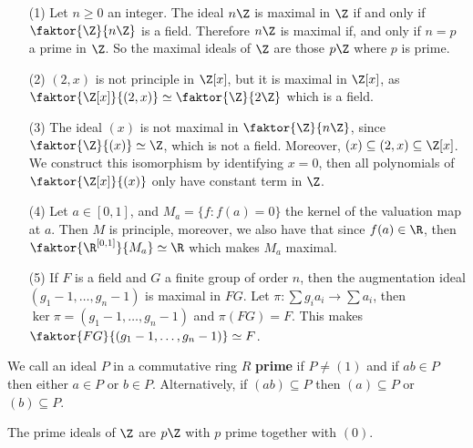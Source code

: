 \begin{example}\label{1.15}
    \begin{enumerate}
        \item[(1)] Let $n \geq 0$ an integer. The ideal  $n\Z$ is maximal in
            $\Z$ if and only if  $\faktor{\Z}{n\Z}$ is a field. Therefore $n\Z$
            is maximal if, and only if  $n=p$ a prime in $\Z$. So the maximal
            ideals of $\Z$ are those  $p\Z$ where  $p$ is prime.

        \item[(2)] $(2,x)$ is not principle in $\Z[x]$, but it is maximal in
            $\Z[x]$, as $\faktor{\Z[x]}{(2,x)} \simeq \faktor{\Z}{2\Z}$ which
            is a field.

        \item[(3)] The ideal $(x)$ is not maximal in $\faktor{\Z}{n\Z}$, since
            $\faktor{\Z}{(x)} \simeq \Z$, which is not a field. Moreover, $(x)
            \subseteq (2,x) \subseteq \Z[x]$. We construct this isomorphism by
            identifying $x=0$, then all polynomials of $\faktor{\Z[x]}{(x)}$ only
            have constant term in $\Z$.

        \item[(4)] Let $a \in [0,1]$, and $M_a=\{f : f(a)=0\}$ the kernel of the
            valuation map at $a$. Then  $M$ is principle, moreover, we also
            have that since  $f(a) \in \R$, then $\faktor{\R^{[0,1]}}{M_a}
            \simeq \R$ which makes $M_a$ maximal.

        \item[(5)] If $F$ is a field and  $G$ a finite group of order $n$, then
            the augmentation ideal  $(g_1-1, \dots, g_n-1)$ is maximal in $FG$.
            Let $\pi:\sum{g_ia_i} \xrightarrow{} \sum{a_i}$, then
             $\ker{\pi}=(g_1-1, \dots, g_n-1)$ and $\pi(FG)=F$. This makes
             $\faktor{FG}{(g_1-1, \dots, g_n-1)} \simeq F$.
    \end{enumerate}
\end{example}

\begin{definition}
    We call an ideal $P$ in a commutative ring  $R$ \textbf{prime} if $P \neq
    (1)$ and if $ab \in P$ then either $a \in P$ or $b \in P$. Alternatively,
    if $(ab) \subseteq P$ then $(a) \subseteq P$ or $(b) \subseteq P$.
\end{definition}

\begin{example}\label{1.16}
    The prime ideals of $\Z$ are $p\Z$ with  $p$ prime together with $(0)$.
\end{example}

